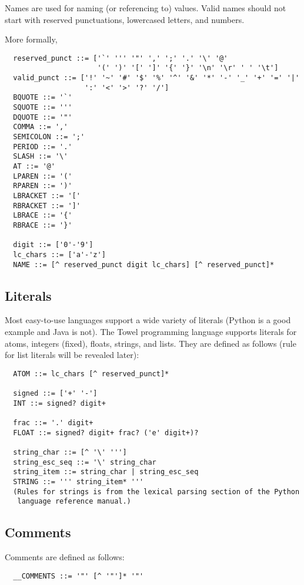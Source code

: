\documentclass{book}
\begin{document}
Names are used for naming (or referencing to) values. Valid names should not start with reserved punctuations, lowercased letters, and numbers.

More formally,
\begin{verbatim}
  reserved_punct ::= ['`' ''' '"' ',' ';' '.' '\' '@' 
                      '(' ')' '[' ']' '{' '}' '\n' '\r' ' ' '\t']
  valid_punct ::= ['!' '~' '#' '$' '%' '^' '&' '*' '-' '_' '+' '=' '|'
                   ':' '<' '>' '?' '/']
  BQUOTE ::= '`'
  SQUOTE ::= '''
  DQUOTE ::= '"'
  COMMA ::= ','
  SEMICOLON ::= ';'
  PERIOD ::= '.'
  SLASH ::= '\'
  AT ::= '@'
  LPAREN ::= '('
  RPAREN ::= ')'
  LBRACKET ::= '['
  RBRACKET ::= ']'
  LBRACE ::= '{'
  RBRACE ::= '}'

  digit ::= ['0'-'9']
  lc_chars ::= ['a'-'z']
  NAME ::= [^ reserved_punct digit lc_chars] [^ reserved_punct]*
\end{verbatim}

\subsection{Literals}

Most easy-to-use languages support a wide variety of literals (Python is a good example and Java is not). The Towel programming language supports literals for atoms, integers (fixed), floats, strings, and lists. They are defined as follows (rule for list literals will be revealed later):
\begin{verbatim}
  ATOM ::= lc_chars [^ reserved_punct]*

  signed ::= ['+' '-']
  INT ::= signed? digit+

  frac ::= '.' digit+
  FLOAT ::= signed? digit+ frac? ('e' digit+)?

  string_char ::= [^ '\' ''']
  string_esc_seq ::= '\' string_char
  string_item ::= string_char | string_esc_seq
  STRING ::= ''' string_item* '''
  (Rules for strings is from the lexical parsing section of the Python
   language reference manual.)
\end{verbatim}

\subsection{Comments}

Comments are defined as follows:
\begin{verbatim}
  __COMMENTS ::= '"' [^ '"']* '"'
\end{verbatim}
\end{document}

